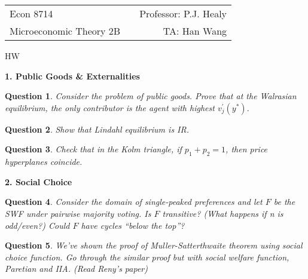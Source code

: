 \documentclass[11pt,leqno]{article}
\newtheorem{HW}{Question}
\begin{document}
\vspace*{-20mm}

\begin{tabular*}{\textwidth}{@{\extracolsep{\fill}}lcr}
Econ 8714     & \hfill    &         Professor: P.J. Healy          \\
Microeconomic Theory 2B  &           &   TA: Han Wang    
\end{tabular*}

\bigskip
\begin{center}
{\Large HW}
\end{center}

\bigskip


\textbf{1. Public Goods \& Externalities}

\begin{HW}
Consider the problem of public goods. Prove that at the Walrasian equilibrium, the only contributor is the agent with highest $v_{j}^{\prime}(y^{*})$.
\end{HW}

\begin{HW}
Show that Lindahl equilibrium is IR.
\end{HW}

\begin{HW}
Check that in the Kolm triangle, if $p_{1}+p_{2}=1$, then price hyperplanes coincide.
\end{HW}

\textbf{2. Social Choice}

\begin{HW}
Consider the domain of single-peaked preferences and let $F$ be the SWF under pairwise majority voting. Is $F$ transitive? (What happens if n is odd/even?) Could $F$ have cycles ``below the top''?
\end{HW}

\begin{HW}
We've shown the proof of Muller-Satterthwaite theorem using social choice function. Go through the similar proof but with social welfare function, Paretian and IIA. (Read Reny's paper)
\end{HW}
\end{document}
